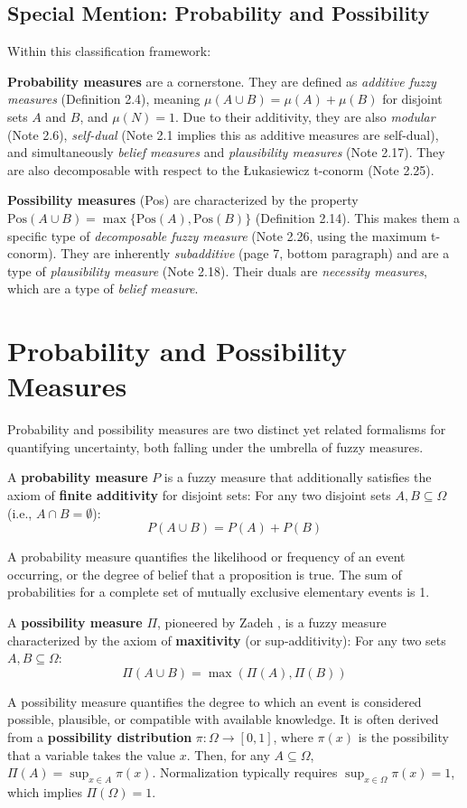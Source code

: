 \subsection*{Special Mention: Probability and Possibility}

Within this classification framework:

\textbf{Probability measures} are a cornerstone. They are defined as \textit{additive fuzzy measures} (Definition 2.4), meaning $\mu(A \cup B) = \mu(A) + \mu(B)$ for disjoint sets $A$ and $B$, and $\mu(N)=1$. Due to their additivity, they are also \textit{modular} (Note 2.6), \textit{self-dual} (Note 2.1 implies this as additive measures are self-dual), and simultaneously \textit{belief measures} and \textit{plausibility measures} (Note 2.17). They are also decomposable with respect to the Łukasiewicz t-conorm (Note 2.25).

\textbf{Possibility measures} (Pos) are characterized by the property $\text{Pos}(A \cup B) = \max\{\text{Pos}(A), \text{Pos}(B)\}$ (Definition 2.14). This makes them a specific type of \textit{decomposable fuzzy measure} (Note 2.26, using the maximum t-conorm). They are inherently \textit{subadditive} (page 7, bottom paragraph) and are a type of \textit{plausibility measure} (Note 2.18). Their duals are \textit{necessity measures}, which are a type of \textit{belief measure}.


\section{Probability and Possibility Measures}
Probability and possibility measures are two distinct yet related formalisms for quantifying uncertainty, both falling under the umbrella of fuzzy measures.

\begin{definition}
A \textbf{probability measure} $P$ is a fuzzy measure that additionally satisfies the axiom of \textbf{finite additivity} for disjoint sets:
For any two disjoint sets $A, B \subseteq \Omega$ (i.e., $A \cap B = \emptyset$):
\[ P(A \cup B) = P(A) + P(B) \]
\end{definition}
A probability measure quantifies the likelihood or frequency of an event occurring, or the degree of belief that a proposition is true. The sum of probabilities for a complete set of mutually exclusive elementary events is 1.

\begin{definition}
A \textbf{possibility measure} $\Pi$, pioneered by Zadeh \cite{Zadeh1978}, is a fuzzy measure characterized by the axiom of \textbf{maxitivity} (or sup-additivity):
For any two sets $A, B \subseteq \Omega$:
\[ \Pi(A \cup B) = \max(\Pi(A), \Pi(B)) \]
\end{definition}
A possibility measure quantifies the degree to which an event is considered possible, plausible, or compatible with available knowledge. It is often derived from a \textbf{possibility distribution} $\pi: \Omega \to [0, 1]$, where $\pi(x)$ is the possibility that a variable takes the value $x$. Then, for any $A \subseteq \Omega$, $\Pi(A) = \sup_{x \in A} \pi(x)$. Normalization typically requires $\sup_{x \in \Omega} \pi(x) = 1$, which implies $\Pi(\Omega) = 1$.

